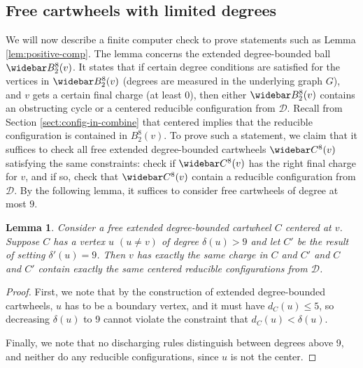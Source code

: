 \documentclass[10pt,a4paper]{article}
\newtheorem{lem}[thm]{Lemma}
\renewcommand{\bar}{\widebar}
\def\cD{{\mathcal D}}
\begin{document}
\subsection{Free cartwheels with  limited degrees}
\label{sect:free-cw-enum}
We will now describe a finite computer check to prove statements such as Lemma \ref{lem:positive-comp}. The lemma concerns the extended degree-bounded ball $\bar B^8_2(v)$. It states that if certain degree conditions are satisfied for the vertices in $\bar B_2^8(v)$ (degrees are measured in the underlying graph $G$), and $v$ gets a certain final charge (at least 0), then either $\bar B^8_2(v)$ contains an obstructing cycle or a centered reducible configuration from $\cD$.
Recall from Section \ref{sect:config-in-combine} that centered implies that the reducible configuration is contained in $B^8_2(v)$.
To prove such a statement, we claim that it suffices to
check all free extended degree-bounded cartwheels $\bar C^8(v)$ satisfying the same constraints: check if $\bar C^8(v)$ has the right final charge for $v$, and if so, check that $\bar C^8(v)$ contain a reducible configuration from $\cD$.
By the following lemma, it suffices to consider free cartwheels of degree at most $9$. 
\begin{lem}\label{lem:max9}
Consider a free extended degree-bounded cartwheel $C$ centered at $v$. Suppose $C$ has a vertex $u$ $(u\neq v)$ of degree $\delta(u)>9$ and let $C'$ be the result of setting  $\delta'(u)=9$. 
Then $v$ has exactly the same charge in $C$ and $C'$ and $C$ and $C'$ contain exactly the same centered reducible configurations from $\cD$.    
\end{lem}
\begin{proof} First, we note that by the construction of extended degree-bounded cartwheels, $u$ has to be a boundary vertex, and it must have $d_C(u)\leq 5$, so decreasing $\delta(u)$ to 9 cannot
violate the constraint that $d_C(u)<\delta(u)$.

Finally, we note that no discharging rules distinguish between degrees above 9, and neither do any reducible configurations, since $u$ is not the center.
\end{proof}
\end{document}
